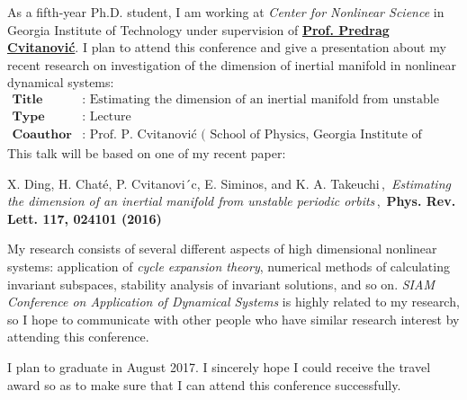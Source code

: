 \documentclass[10pt,stdletter,dateno,sigleft]{newlfm} %
\begin{document}
\begin{newlfm}

As a fifth-year Ph.D. student, I am working at \textit{Center for Nonlinear Science} 
in Georgia Institute of Technology under supervision of  
\href{http://www.cns.gatech.edu/~predrag/}{\textbf{Prof. Predrag Cvitanovi\'c}}. 
I plan to attend this conference and give a presentation about my recent research
on investigation of the dimension of inertial manifold in nonlinear dynamical systems:
\begin{align*}
  \textbf{Title} & \text{: Estimating the dimension of an inertial manifold from unstable periodic orbits} \\
  \textbf{Type} & \text{: Lecture} \\
  \textbf{Coauthor} & \text{: Prof. P. Cvitanovi\'c ( 
                      School of Physics, Georgia Institute of Technology)}
\end{align*}
This talk will be based on one of my recent paper: 


X. Ding,  H. Chaté, P. Cvitanovi´c, E. Siminos, and K. A. Takeuchi\,,\,
\emph{Estimating the dimension of an inertial manifold from unstable periodic orbits}\,,\,
\textbf{Phys. Rev. Lett. 117, 024101 (2016)}

My research consists of several different aspects of high dimensional nonlinear
systems: application of 
\textit{cycle expansion theory}, numerical 
methods of calculating invariant subspaces, stability 
analysis of invariant solutions, and so on.
\textit{SIAM Conference on Application of Dynamical Systems}
is highly related to my research, so I hope to communicate with other people who have
similar research interest by attending this conference.
 
I plan to graduate in August 2017. I sincerely hope I could receive the 
travel award so as to make sure that I can attend this conference successfully. 


\end{newlfm}
\end{document}
